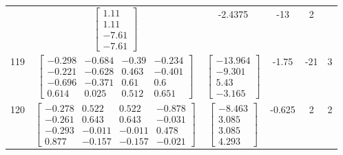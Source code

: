 \documentclass[a4paper,12pt]{article}
\begin{document}
\begin{tabular}{c c c c c c}
&
$\begin{bmatrix} 1.11 \\ 1.11 \\ -7.61 \\ -7.61 \end{bmatrix}$
&
-2.4375
&
-13
&
2
\\
119
&
$\begin{bmatrix} -0.298 & -0.684 & -0.39 & -0.234 \\ -0.221 & -0.628 & 0.463 & -0.401 \\ -0.696 & -0.371 & 0.61 & 0.6 \\ 0.614 & 0.025 & 0.512 & 0.651 \end{bmatrix}$
&
$\begin{bmatrix} -13.964 \\ -9.301 \\ 5.43 \\ -3.165 \end{bmatrix}$
&
-1.75
&
-21
&
3
\\
120
&
$\begin{bmatrix} -0.278 & 0.522 & 0.522 & -0.878 \\ -0.261 & 0.643 & 0.643 & -0.031 \\ -0.293 & -0.011 & -0.011 & 0.478 \\ 0.877 & -0.157 & -0.157 & -0.021 \end{bmatrix}$
&
$\begin{bmatrix} -8.463 \\ 3.085 \\ 3.085 \\ 4.293 \end{bmatrix}$
&
-0.625
&
2
&
2
\\
\end{tabular} \egroup \newpage
\end{document}
